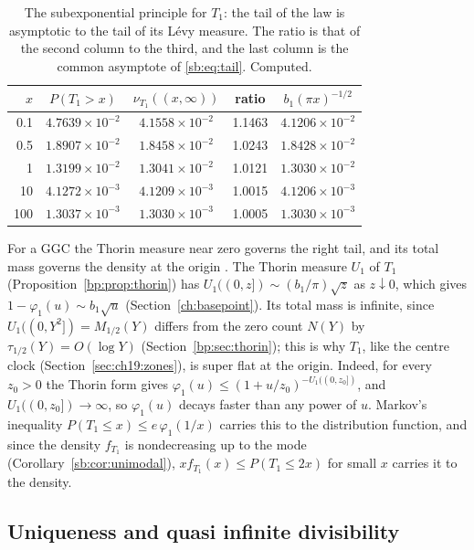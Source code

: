 \begin{table}[htbp]
\centering\small
\begin{tabular}{rcccc}
\toprule
$x$ & $P(T_1>x)$ & $\nu_{T_1}((x,\infty))$ & ratio & $b_1(\pi x)^{-1/2}$\\
\midrule
0.1 & $4.7639\times10^{-2}$ & $4.1558\times10^{-2}$ & 1.1463 & $4.1206\times10^{-2}$\\
0.5 & $1.8907\times10^{-2}$ & $1.8458\times10^{-2}$ & 1.0243 & $1.8428\times10^{-2}$\\
1 & $1.3199\times10^{-2}$ & $1.3041\times10^{-2}$ & 1.0121 & $1.3030\times10^{-2}$\\
10 & $4.1272\times10^{-3}$ & $4.1209\times10^{-3}$ & 1.0015 & $4.1206\times10^{-3}$\\
100 & $1.3037\times10^{-3}$ & $1.3030\times10^{-3}$ & 1.0005 & $1.3030\times10^{-3}$\\
\bottomrule
\end{tabular}
\caption{The subexponential principle for $T_1$: the tail of the law is asymptotic to the tail of its L\'evy measure. The ratio is that of the second column to the third, and the last column is the common asymptote of \eqref{sb:eq:tail}. Computed.}
\label{sb:tab:tail}
\end{table}

For a GGC the Thorin measure near zero governs the right tail, and its total mass governs the density at the origin \cite{Bondesson}. The Thorin measure $U_1$ of $T_1$ (Proposition~\ref{bp:prop:thorin}) has $U_1((0,z])\sim(b_1/\pi)\sqrt z$ as $z\downarrow0$, which gives $1-\varphi_1(u)\sim b_1\sqrt u$ (Section~\ref{ch:basepoint}). Its total mass is infinite, since $U_1((0,Y^2])=M_{1/2}(Y)$ differs from the zero count $N(Y)$ by $\tau_{1/2}(Y)=O(\log Y)$ (Section~\ref{bp:sec:thorin}); this is why $T_1$, like the centre clock (Section~\ref{sec:ch19:zones}), is super flat at the origin. Indeed, for every $z_0>0$ the Thorin form gives $\varphi_1(u)\le(1+u/z_0)^{-U_1((0,z_0])}$, and $U_1((0,z_0])\to\infty$, so $\varphi_1(u)$ decays faster than any power of $u$. Markov's inequality $P(T_1\le x)\le e\,\varphi_1(1/x)$ carries this to the distribution function, and since the density $f_{T_1}$ is nondecreasing up to the mode (Corollary~\ref{sb:cor:unimodal}), $xf_{T_1}(x)\le P(T_1\le2x)$ for small $x$ carries it to the density.

\subsection{Uniqueness and quasi infinite divisibility}\label{sb:sec:qid}

